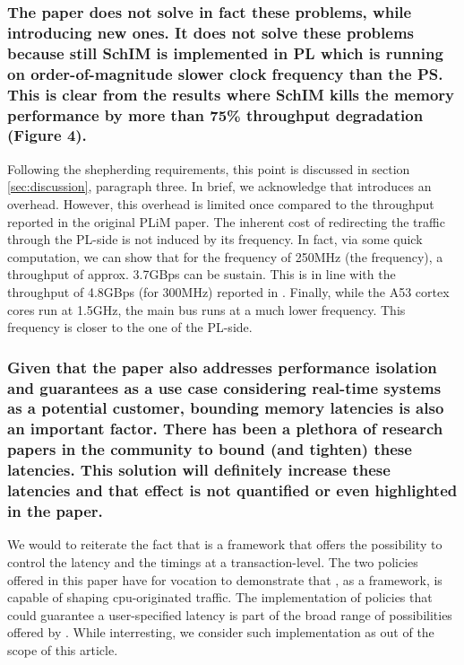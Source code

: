         \subsubsection{The paper does not solve in fact these problems, while introducing new ones. It does not solve these problems because still SchIM is implemented in PL which is running on order-of-magnitude slower clock frequency than the PS. This is clear from the results where SchIM kills the memory performance by more than 75\% throughput degradation (Figure 4).}
            Following the shepherding requirements, this point is discussed in section \ref{sec:discussion}, paragraph three.
            In brief, we acknowledge that \schim introduces an overhead. However, this overhead is limited once compared to the throughput reported in the original PLiM paper.
            The inherent cost of redirecting the traffic through the PL-side is not induced by its frequency. In fact, via some quick computation, we can show that for the frequency of 250MHz (the \schim frequency), a throughput of approx. 3.7GBps can be sustain. This is in line with the throughput of 4.8GBps (for 300MHz) reported in \cite{uiuc-xilinx-port-study}.
            Finally, while the A53 cortex cores run at 1.5GHz, the main bus runs at a much lower frequency. This frequency is closer to the one of the PL-side.

        \subsubsection{Given that the paper also addresses performance isolation and guarantees as a use case considering real-time systems as a potential customer, bounding memory latencies is also an important factor. There has been a plethora of research papers in the community to bound (and tighten) these latencies. This solution will definitely increase these latencies and that effect is not quantified or even highlighted in the paper.}
            We would to reiterate the fact that \schim is a framework that offers the possibility to control the latency and the timings at a transaction-level.
            The two policies offered in this paper have for vocation to demonstrate that \schim, as a framework, is capable of shaping cpu-originated traffic.
            The implementation of policies that could guarantee a user-specified latency is part of the broad range of possibilities offered by \schim.
            While interresting, we consider such implementation as out of the scope of this article.

